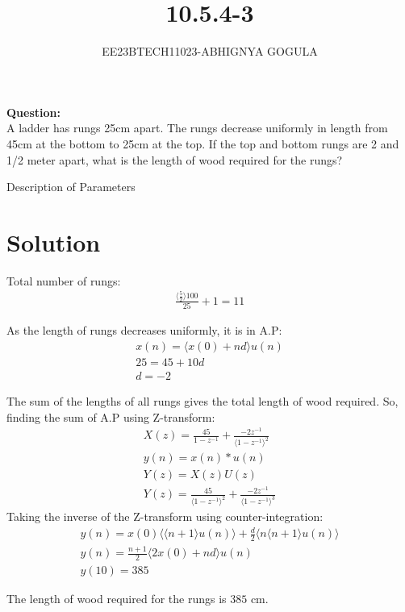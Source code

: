 \documentclass[journal,12pt,twocolumn]{IEEEtran}
\newcommand{\brak}[1]{\langle #1 \rangle}
\theoremstyle{remark}
\begin{document}

\vspace{3cm}
\title{\textbf{10.5.4-3}}
\author{EE23BTECH11023-ABHIGNYA GOGULA}
\maketitle
\newpage
\bigskip
\renewcommand{\thefigure}{\theenumi}
\renewcommand{\thetable}{\theenumi}
\textbf{Question:}
\\
 A ladder has rungs 25cm apart. The rungs decrease uniformly in length from 45cm at the bottom to 25cm at the top. If the top and bottom rungs are 2 and 1/2 meter apart, what is the length of wood required for the rungs?

\begin{table}[h]
\centering

\caption{Description of Parameters}
\label{tab:parameter-values}
\end{table}

\section*{Solution}
Total number of rungs:
\begin{align}
\frac{\brak{\frac{5}{2}}100}{25}+1 = 11
\end{align}

As the length of rungs decreases uniformly, it is in A.P:
\begin{align}
x(n) = \brak{x(0) + nd}u(n) \\
25 = 45 + 10d \\
d = -2
\end{align}

The sum of the lengths of all rungs gives the total length of wood required. So, finding the sum of A.P using Z-transform:
\begin{align}
X(z) = \frac{45}{1-z^{-1}} + \frac{-2z^{-1}}{\brak{1-z^{-1}}^{2}}\\
y(n)=x(n)*u(n)\\
Y(z)=X(z)U(z)\\
Y(z)=\frac{45}{\brak{1-z^{-1}}^2}+ \frac{-2z^{-1}}{\brak{1-z^{-1}}^{3}}
\end{align}
Taking the inverse of the Z-transform using counter-integration:
\begin{align}
y(n) = x(0)\brak{\brak{n+1}u(n)}+\frac{d}{2}\brak{n\brak{n+1}u(n)} \\
y(n) = \frac{n+1}{2}\brak{2x(0)+nd}u(n) \\
y(10) = 385
\end{align}

The length of wood required for the rungs is $385$ cm.
\end{document}
